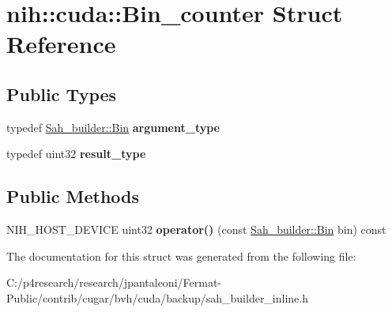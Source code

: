 \hypertarget{structnih_1_1cuda_1_1_bin__counter}{}\section{nih\+:\+:cuda\+:\+:Bin\+\_\+counter Struct Reference}
\label{structnih_1_1cuda_1_1_bin__counter}
\subsection*{Public Types}
\begin{DoxyCompactItemize}
\item 
\mbox{\label{structnih_1_1cuda_1_1_bin__counter_af93c779bee8848ca24d327afb341026c}} 
typedef \hyperlink{structnih_1_1cuda_1_1_sah__builder_1_1_bin}{Sah\+\_\+builder\+::\+Bin} {\bfseries argument\+\_\+type}
\item 
\mbox{\label{structnih_1_1cuda_1_1_bin__counter_a36a34503291d6bb3fecee3db69ec9223}} 
typedef uint32 {\bfseries result\+\_\+type}
\end{DoxyCompactItemize}
\subsection*{Public Methods}
\begin{DoxyCompactItemize}
\item 
\mbox{\label{structnih_1_1cuda_1_1_bin__counter_a19d15f833433e88b00b98b09f0291ad6}} 
N\+I\+H\+\_\+\+H\+O\+S\+T\+\_\+\+D\+E\+V\+I\+CE uint32 {\bfseries operator()} (const \hyperlink{structnih_1_1cuda_1_1_sah__builder_1_1_bin}{Sah\+\_\+builder\+::\+Bin} bin) const
\end{DoxyCompactItemize}


The documentation for this struct was generated from the following file\+:\begin{DoxyCompactItemize}
\item 
C\+:/p4research/research/jpantaleoni/\+Fermat-\/\+Public/contrib/cugar/bvh/cuda/backup/sah\+\_\+builder\+\_\+inline.\+h\end{DoxyCompactItemize}
